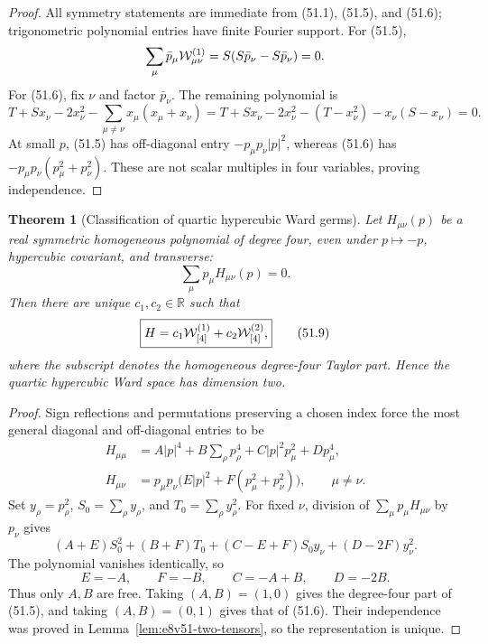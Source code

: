 \documentclass[11pt,oneside]{book}
\newtheorem{theorem}{Theorem}[chapter]
\theoremstyle{definition}
\theoremstyle{remark}
\begin{document}
\begin{proof}
All symmetry statements are immediate from (51.1), (51.5), and
(51.6); trigonometric polynomial entries have finite Fourier
support.  For (51.5),
\[
 \sum_\mu\bar p_\mu{\cal W}^{(1)}_{\mu\nu}
 =S(S\bar p_\nu-S\bar p_\nu)=0.
\]
For (51.6), fix \(\nu\) and factor \(\bar p_\nu\).  The remaining
polynomial is
\[
 T+Sx_\nu-2x_\nu^2
 -\sum_{\mu\ne\nu}x_\mu(x_\mu+x_\nu)
 =T+Sx_\nu-2x_\nu^2
 -(T-x_\nu^2)-x_\nu(S-x_\nu)=0.
\]
At small \(p\), (51.5) has off-diagonal entry
\(-p_\mu p_\nu|p|^2\), whereas (51.6) has
\(-p_\mu p_\nu(p_\mu^2+p_\nu^2)\).  These are not scalar
multiples in four variables, proving independence.
\end{proof}

\begin{theorem}[Classification of quartic hypercubic Ward germs]
\label{thm:e8v51-quartic-classification}
Let \(H_{\mu\nu}(p)\) be a real symmetric homogeneous polynomial of
degree four, even under \(p\mapsto-p\), hypercubic covariant, and
transverse:
\[
 \sum_\mu p_\mu H_{\mu\nu}(p)=0.                              \tag{51.8}
\]
Then there are unique \(c_1,c_2\in\mathbb R\) such that
\[
 \boxed{
 H=c_1{\cal W}^{(1)}_{[4]}+c_2{\cal W}^{(2)}_{[4]},}           \tag{51.9}
\]
where the subscript denotes the homogeneous degree-four Taylor
part.  Hence the quartic hypercubic Ward space has dimension two.
\end{theorem}

\begin{proof}
Sign reflections and permutations preserving a chosen index force
the most general diagonal and off-diagonal entries to be
\[
\begin{split}
 H_{\mu\mu}
 &=A|p|^4+B\sum_\rho p_\rho^4
   +C|p|^2p_\mu^2+Dp_\mu^4,\\
 H_{\mu\nu}
 &=p_\mu p_\nu\bigl(E|p|^2+F(p_\mu^2+p_\nu^2)\bigr),
 \qquad\mu\ne\nu.                                            \tag{51.10}
\end{split}
\]
Set \(y_\rho=p_\rho^2\), \(S_0=\sum_\rho y_\rho\), and
\(T_0=\sum_\rho y_\rho^2\).  For fixed \(\nu\), division of
\(\sum_\mu p_\mu H_{\mu\nu}\) by \(p_\nu\) gives
\[
 (A+E)S_0^2+(B+F)T_0
 +(C-E+F)S_0y_\nu+(D-2F)y_\nu^2.                             \tag{51.11}
\]
The polynomial vanishes identically, so
\[
 E=-A,\qquad F=-B,\qquad C=-A+B,\qquad D=-2B.                \tag{51.12}
\]
Thus only \(A,B\) are free.  Taking \((A,B)=(1,0)\) gives the
degree-four part of (51.5), and taking \((A,B)=(0,1)\) gives that
of (51.6).  Their independence was proved in
Lemma~\ref{lem:e8v51-two-tensors}, so the representation is unique.
\end{proof}
\end{document}
